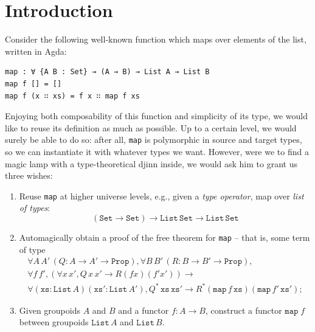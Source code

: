 \section{Introduction}

Consider the following well-known function which maps
over elements of the list, written in Agda:

\begin{verbatim}
map : ∀ {A B : Set} → (A → B) → List A → List B
map f [] = []
map f (x ∷ xs) = f x ∷ map f xs
\end{verbatim}

Enjoying both composability of this function and
simplicity of its type, we would like to reuse its
definition as much as possible. Up to a certain level,
we would surely be able to do so: after all,
\texttt{map} is polymorphic in source and target types,
so we can instantiate it with whatever types we want.
However, were we to find a magic lamp with a
type-theoretical djinn inside, we would ask him to grant
us three wishes:

\begin{enumerate}
    \item Reuse \texttt{map} at higher universe levels,
        e.g., given a \textit{type operator}, map over
        \textit{list of types}:
        \[
            (\mathtt{Set}\to\mathtt{Set})\to
            \mathtt{List}\,\mathtt{Set}\to
            \mathtt{List}\,\mathtt{Set}
        \]
    \item Automagically obtain a proof of the free
        theorem for \texttt{map} -- that is, some term
        of type
        \begin{multline*}
            \forall A\,A'\,(Q:A\to A'\to\mathtt{Prop}),
            \forall B\,B'\,(R:B\to B'\to\mathtt{Prop}),
            \\
            \forall f\,f',\left(
                \forall x\,x',Q\,x\,x'\to
                R(f x)\left(f' x'\right)
            \right)\to\\
            \forall
                (\mathtt{xs}:\mathtt{List}\,A)
                (\mathtt{xs}':\mathtt{List}\,A'),
            Q^*\,\mathtt{xs}\,\mathtt{xs}'\to
            R^*(\mathtt{map}\,f\,\mathtt{xs})
                (\mathtt{map}\,f'\,\mathtt{xs}');
        \end{multline*}
    \item Given groupoids $A$ and $B$ and a functor
        $f: A \to B$, construct a functor
        $\mathtt{map}\;f$ between groupoids
        $\mathtt{List}\,A$ and $\mathtt{List}\,B$.
\end{enumerate}

